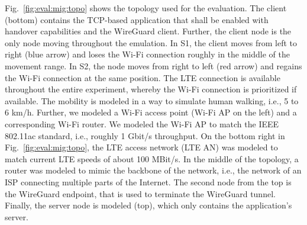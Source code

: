 Fig.~\ref{fig:eval:mig:topo} shows the topology used for the evaluation.
The client (bottom) contains the TCP-based application that shall be enabled with handover capabilities and the WireGuard client.
Further, the client node is the only node moving throughout the emulation.
In S1, the client moves from left to right (blue arrow) and loses the Wi-Fi connection roughly in the middle of the movement range. 
In S2, the node moves from right to left (red arrow) and regains the Wi-Fi connection at the same position.
The LTE connection is available throughout the entire experiment, whereby the Wi-Fi connection is prioritized if available.
The mobility is modeled in a way to simulate human walking, i.e., 5 to 6 km/h.
Further, we modeled a Wi-Fi access point (Wi-Fi AP on the left) and a corresponding Wi-Fi router.
We modeled the Wi-Fi AP to match the IEEE 802.11ac standard, i.e., roughly 1 Gbit/s throughput.
On the bottom right in Fig.~\ref{fig:eval:mig:topo}, the LTE access network (LTE AN) was modeled to match current LTE speeds of about 100 MBit/s.
In the middle of the topology, a router was modeled to mimic the backbone of the network, i.e., the network of an ISP connecting multiple parts of the Internet.
The second node from the top is the WireGuard endpoint, that is used to terminate the WireGuard tunnel.
Finally, the server node is modeled (top), which only contains the application's server.


